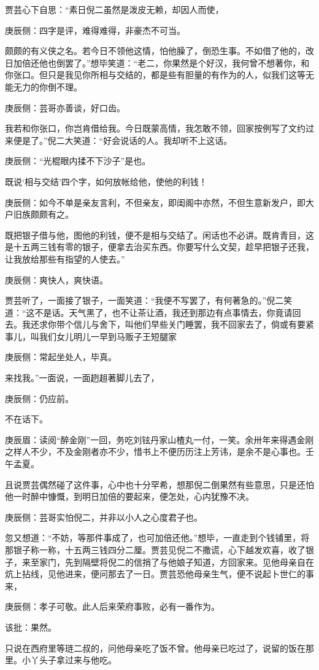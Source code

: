 \begin{parag}
    贾芸心下自思：“素日倪二虽然是泼皮无赖，却因人而使，\begin{note}庚辰侧：四字是评，难得难得，非豪杰不可当。\end{note}颇颇的有义侠之名。若今日不领他这情，怕他臊了，倒恐生事。不如借了他的，改日加倍还他也倒罢了。”想毕笑道：“老二，你果然是个好汉，我何曾不想著你，和你张口。但只是我见你所相与交结的，都是些有胆量的有作为的人，似我们这等无能无力的你倒不理。\begin{note}庚辰侧：芸哥亦善谈，好口齿。\end{note}我若和你张口，你岂肯借给我。今日既蒙高情，我怎敢不领，回家按例写了文约过来便是了。”倪二大笑道：“好会说话的人。我却听不上这话。\begin{note}庚辰侧：“光棍眼内揉不下沙子”是也。\end{note}既说‘相与交结’四个字，如何放帐给他，使他的利钱！\begin{note}庚辰侧：如今不单是亲友言利，不但亲友，即闺阁中亦然，不但生意新发户，即大户旧族颇颇有之。\end{note}既把银子借与他，图他的利钱，便不是相与交结了。闲话也不必讲。既肯青目，这是十五两三钱有零的银子，便拿去治买东西。你要写什么文契，趁早把银子还我，让我放给那些有指望的人使去。”\begin{note}庚辰侧：爽快人，爽快语。\end{note}贾芸听了，一面接了银子，一面笑道：“我便不写罢了，有何著急的。”倪二笑道：“这不是话。天气黑了，也不让茶让酒，我还到那边有点事情去，你竟请回去。我还求你带个信儿与舍下，叫他们早些关门睡罢，我不回家去了，倘或有要紧事儿，叫我们女儿明儿一早到马贩子王短腿家\begin{note}庚辰侧：常起坐处人，毕真。\end{note}来找我。”一面说，一面趔趄著脚儿去了，\begin{note}庚辰侧：仍应前。\end{note}不在话下。\begin{note}庚辰眉：读阅“醉金刚”一回，务吃刘铉丹家山楂丸一付，一笑。余卅年来得遇金刚之样人不少，不及金刚者亦不少，惜书上不便历历注上芳讳，是余不是心事也。壬午孟夏。\end{note}
\end{parag}


\begin{parag}
    且说贾芸偶然碰了这件事，心中也十分罕希，想那倪二倒果然有些意思，只是还怕他一时醉中慷慨，到明日加倍的要起来，便怎处，心内犹豫不决。\begin{note}庚辰侧：芸哥实怕倪二，并非以小人之心度君子也。\end{note}忽又想道：“不妨，等那件事成了，也可加倍还他。”想毕，一直走到个钱铺里，将那银子称一称，十五两三钱四分二厘。贾芸见倪二不撒谎，心下越发欢喜，收了银子，来至家门，先到隔壁将倪二的信捎了与他娘子知道，方回家来。见他母亲自在炕上拈线，见他进来，便问那去了一日。贾芸恐他母亲生气，便不说起卜世仁的事来，\begin{note}庚辰侧：孝子可敬。此人后来荣府事败，必有一番作为。\end{note}\begin{note}该批：果然。\end{note}只说在西府里等琏二叔的，问他母亲吃了饭不曾。他母亲已吃过了，说留的饭在那里。小丫头子拿过来与他吃。
\end{parag}



